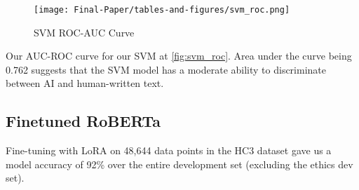 \documentclass[11pt]{article}
\begin{document}
\begin{table}[H]
\centering
\caption{SVM Classification Report}
\label{tab:svm_table}
\end{table}


\begin{figure}[H]
    \centering
    \texttt{[image: Final-Paper/tables-and-figures/svm\_roc.png]}
    \caption{SVM ROC-AUC Curve}
    \label{fig:svm_roc}
\end{figure}


Our AUC-ROC \cite{hanley1982meaning} curve for our SVM at \autoref{fig:svm_roc}.
Area under the curve being 0.762 suggests that the SVM model has a moderate ability to discriminate between AI and human-written text.
\subsection{Finetuned RoBERTa}
\label{sec:roberta_finetuning}
Fine-tuning with LoRA on 48,644 data points in the HC3 dataset gave us a  model accuracy of 92\% over the entire development set (excluding the ethics dev set).

\begin{table}[H]
\centering
\caption{Finetuned RoBERTa Classification Report for Entire Dev Set}
\label{tab:entire_dataset}
\end{table}
\end{document}
